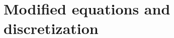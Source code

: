 
\section{Modified equations and discretization} %
\label{sec:modified_equations_and_discretization}



